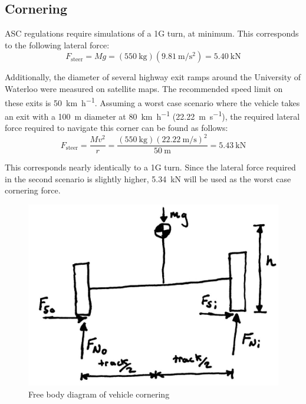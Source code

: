 \documentclass[10pt]{article}
\begin{document}
\subsection{Cornering}
ASC regulations require simulations of a 1G turn, at minimum. This corresponds to the following lateral force:
\begin{equation}
F_\mathrm{steer} = Mg = (\SI{550}{\kilo\gram})(\SI{9.81}{\metre\per\second\squared}) = \SI{5.40}{\kilo\newton}
\end{equation}

Additionally, the diameter of several highway exit ramps around the University of Waterloo were measured on satellite maps. The recommended speed limit on these exits is \SI{50}{\kilo\metre\per\hour}. Assuming a worst case scenario where the vehicle takes an exit with a \SI{100}{\metre} diameter at \SI{80}{\kilo\metre\per\hour} (\SI{22.22}{\metre\per\second}), the required lateral force required to navigate this corner can be found as follows: 
\begin{equation}
F_\mathrm{steer} = \frac{Mv^2}{r} = \frac{(\SI{550}{\kilo\gram})(\SI{22.22}{\metre\per\second})^2}{\SI{50}{\metre}} = \SI{5.43}{\kilo\newton}
\end{equation}

This corresponds nearly identically to a 1G turn. Since the lateral force required in the second scenario is slightly higher, \SI{5.34}{\kilo\newton} will be used as the worst case cornering force.

\begin{figure}
\centering
\includegraphics[width=.5\textwidth]{figures/cornering-fbd.jpg}
\caption{Free body diagram of vehicle cornering}
\label{fig:cornering-fbd}
\end{figure}
\end{document}
